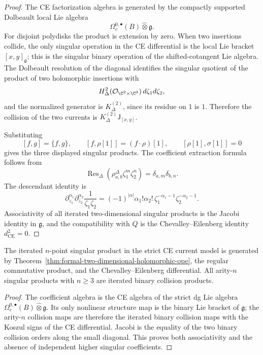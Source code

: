 \begin{proof}
The CE factorization algebra is generated by the compactly supported
Dolbeault local Lie algebra
\[
  \Omega_c^{0,\bullet}(B)\widehat\otimes\mathfrak g .
\]
For disjoint polydisks the product is extension by zero.  When two
insertions collide, the only singular operation in the CE differential
is the local Lie bracket
\([x,y]_{\mathfrak g}\); this is the singular binary operation of
the shifted-cotangent Lie algebra.  The Dolbeault resolution of the
diagonal identifies the singular quotient of the product of two
holomorphic insertions with
\[
  H^2_\Delta(\mathcal O_{\C^2\times\C^2})\,d\zeta_1d\zeta_2,
\]
and the normalized generator is \(K^{(2)}_\Delta\), since its residue on
\(1\) is \(1\).  Therefore the collision of the two currents is
\(K^{(2)}_\Delta\mathsf{J}_{[x,y]}\).

Substituting
\[
  [f,g]=\{f,g\},\qquad
  [f,\rho[1]]=(f\cdot\rho)[1],\qquad
  [\rho[1],\sigma[1]]=0
\]
gives the three displayed singular products.  The coefficient extraction formula
follows from
\[
  \operatorname{Res}_\Delta(\rho^\Delta_{a,b}\zeta_1^m\zeta_2^n)
  =
  \delta_{a,m}\delta_{b,n}.
\]
The descendant identity is
\[
  \partial_{z_1}^{\alpha_1}\partial_{z_2}^{\alpha_2}
  \frac{1}{\zeta_1\zeta_2}
  =
  (-1)^{|\alpha|}\alpha_1!\alpha_2!\,
  \zeta_1^{-\alpha_1-1}\zeta_2^{-\alpha_2-1}.
\]
Associativity of all iterated two-dimensional singular products is the Jacobi
identity in \(\mathfrak g\), and the compatibility with \(Q\) is the
Chevalley--Eilenberg identity \(d_{\mathrm{CE}}^2=0\).
\end{proof}

\begin{cor}
\label{cor:binary-generation-higher-two-dimensional-ope}
The iterated \(n\)-point singular product in the strict CE current
model is generated by
Theorem~\ref{thm:formal-two-dimensional-holomorphic-ope}, the regular
commutative product, and the Chevalley--Eilenberg differential.  All
arity-\(n\) singular products with \(n\ge3\) are iterated binary
collision products.
\end{cor}

\begin{proof}
The coefficient algebra is the CE algebra of the strict dg Lie algebra
\(\Omega_c^{0,\bullet}(B)\widehat\otimes\mathfrak g\).  Its only
nonlinear structure map is the binary Lie bracket of \(\mathfrak g\);
the arity-\(n\) collision maps are therefore the iterated binary
collision maps with the Koszul signs of the CE differential.  Jacobi is
the equality of the two binary collision orders along the small
diagonal.  This proves both associativity and the absence of independent
higher singular coefficients.
\end{proof}

